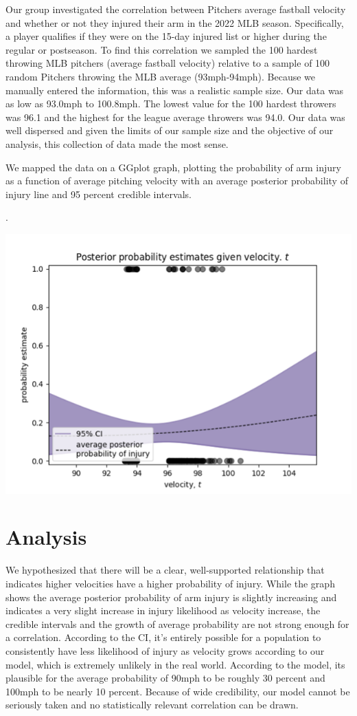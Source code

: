 \documentclass{article}
\begin{document}
Our group investigated the correlation between Pitchers average fastball velocity and whether or not they injured their arm in the 2022 MLB season. Specifically, a player qualifies if they were on the 15-day injured list or higher during the regular or postseason. To find this correlation we sampled the 100 hardest throwing MLB pitchers (average fastball velocity) relative to a sample of 100 random Pitchers throwing the MLB average (93mph-94mph). Because we manually entered the information, this was a realistic sample size. Our data was as low as 93.0mph to 100.8mph. The lowest value for the 100 hardest throwers was 96.1 and the highest for the league average throwers was 94.0. Our data was well dispersed and given the limits of our sample size and the objective of our analysis, this collection of data made the most sense. 
    
We mapped the data on a GGplot graph, plotting the probability of arm injury as a function of average pitching velocity  with an average posterior probability of injury line and 95 percent credible intervals. 

.

\includegraphics{Graph}

\raggedbottom 
\section{Analysis}

We hypothesized that there will be a clear, well-supported relationship that indicates higher velocities have a higher probability of injury. While the graph shows the average posterior probability of arm injury is slightly increasing and indicates a very slight increase in injury likelihood as velocity increase, the credible intervals and the growth of average probability are not strong enough for a correlation. According to the CI, it's entirely possible for a population to consistently have less likelihood of injury as velocity grows according to our model, which is extremely unlikely in the real world. According to the model, its plausible for the average probability of 90mph to be roughly 30 percent and 100mph to be nearly 10 percent. Because of wide credibility, our model cannot be seriously taken and no statistically relevant correlation can be drawn. 
\end{document}
